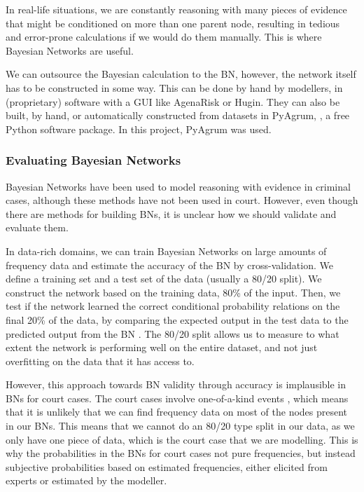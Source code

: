 \documentclass[12pt]{article}
\begin{document}
In real-life situations, we are constantly reasoning with many pieces of evidence that might be conditioned on more than one parent node, resulting in tedious and error-prone calculations if we would do them manually. This is where Bayesian Networks are useful. 



We can outsource the Bayesian calculation to the BN, however, the network itself has to be constructed in some way. This can be done by hand by modellers, in (proprietary) software with a GUI like AgenaRisk or Hugin. They can also be built, by hand, or automatically constructed from datasets in PyAgrum, \citep{pyagrum2020}, a free Python software package. In this project, PyAgrum was used.



\subsubsection{Evaluating Bayesian Networks}

Bayesian Networks have been used to model reasoning with evidence in criminal cases, although these methods have not been used in court. However, even though there are methods for building BNs, it is unclear how we should validate and evaluate them. 

In data-rich domains, we can train Bayesian Networks on large amounts of frequency data and estimate the accuracy of the BN by cross-validation. We define a training set and a test set of the data (usually a 80/20 split). We construct the network based on the training data, 80\% of the input. Then, we test if the network learned the correct conditional probability relations on the final 20\% of the data, by comparing the expected output in the test data to the predicted output from the BN \citep{chen2012}. The 80/20 split allows us to measure to what extent the network is performing well on the entire dataset, and not just overfitting on the data that it has access to.

However, this approach towards BN validity through accuracy is implausible in BNs for court cases. The court cases involve one-of-a-kind events \citep{schum1982}, which means that it is unlikely that we can find frequency data on most of the nodes present in our BNs. This means that we cannot do an 80/20 type split in our data, as we only have one piece of data, which is the court case that we are modelling. This is why the probabilities in the BNs for court cases not pure frequencies, but instead subjective probabilities based on estimated frequencies, either elicited from experts or estimated by the modeller.
\end{document}
